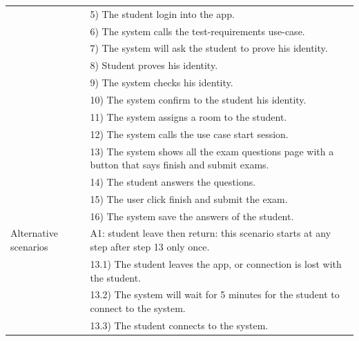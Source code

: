 \documentclass[]{uc2pfecaneva}
\begin{document}
\begin{table}[h]
\begin{tabularx}{\textwidth}{|l|X|}
            & 5) The student login into the app.                                                                \\
            & 6) The system calls the test-requirements use-case.                                               \\
            & 7) The system will ask the student to prove his identity.                                         \\
            & 8) Student proves his identity.                                                                   \\
            & 9) The system checks his identity.                                                                \\
            & 10) The system confirm to the student his identity.                                               \\
            & 11) The system assigns a room to the student.                                                     \\
            & 12) The system calls the use case start session.                                                  \\
            & 13) The system shows all the exam questions page with a button that says finish and submit exams. \\
            & 14) The student answers the questions.                                                            \\
            & 15) The user click finish and submit the exam.                                                    \\
            & 16) The system save the answers of the student.                                                   \\ \hline
            Alternative scenarios
            & A1: student leave then return: this scenario starts at any step after step 13 only once.          \\
            & \hspace{4mm}13.1) The student leaves the app, or connection is lost with the student.             \\
            & \hspace{4mm}13.2) The system will wait for 5 minutes for the student to connect to the system.    \\
            & \hspace{4mm}13.3) The student connects to the system.                                             \\

\end{tabularx}
\end{table}
\end{document}
